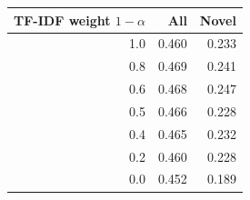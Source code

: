 \begin{tabular}{rrr}
\toprule
TF-IDF weight $1-\alpha$ & All & Novel \\
\midrule
1.0 & 0.460 & 0.233 \\
0.8 & 0.469 & 0.241 \\
0.6 & 0.468 & 0.247 \\
0.5 & 0.466 & 0.228 \\
0.4 & 0.465 & 0.232 \\
0.2 & 0.460 & 0.228 \\
0.0 & 0.452 & 0.189 \\
\bottomrule
\end{tabular}